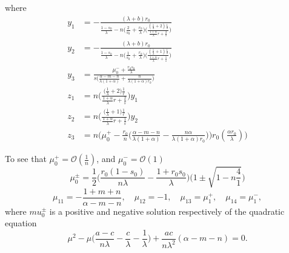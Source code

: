 \documentclass[a4paper,11pt]{article}
\def\BO{{\mathcal{O}}}
\begin{document}
where
\begin{align*}
 y_1&=-\frac{(\lambda+b)r_0}{\frac{1-s_0}{\lambda} - n\Big(\frac{2}{s_0}+\frac{r_0}{\lambda}\Big)\Big(\frac{(\frac{1}{\lambda}+2)\frac{1}{s}}{ \frac{1+\alpha}{\lambda}r + \frac{2}{s} }\Big) }\\
 y_2&=-\frac{(\lambda+b)r_0}{\frac{1-s_0}{\lambda} - n\Big(\frac{1}{s_0}+\frac{r_0}{\lambda}\Big)\Big(\frac{(\frac{1}{\lambda}+1)\frac{1}{s}}{ \frac{1+\alpha}{\lambda}r + \frac{1}{s} }\Big) }\\
 y_3&=\frac{\mu_0^- +\frac{r_0s_0}{\lambda}}{s\Big(\frac{\alpha-m-n}{\lambda(1+\alpha)} + \frac{n}{\lambda(1+\alpha)r_0}\Big)}\\
 z_1&=n\bigg(\frac{\big(\frac{1}{\lambda}+2\big)\frac{1}{r}}{ \frac{1+\alpha}{\lambda}r + \frac{2}{s} }\bigg)y_1 \\
 z_2&=n\bigg(\frac{\big(\frac{1}{\lambda}+1\big)\frac{1}{r}}{ \frac{1+\alpha}{\lambda}r + \frac{1}{s} }\bigg)y_2 \\
 z_3&=n\bigg(\mu_0^+-\frac{r_0}{n}\Big(\frac{\alpha-m-n}{\lambda(1+\alpha)} - \frac{n\alpha}{\lambda(1+\alpha)r_0}\Big)\bigg)r_0(\frac{\alpha r_0}{\lambda})\bigg)
\end{align*}
 



To see that $\mu_0^+ = \BO(\frac{1}{n})$, and $\mu_0^-=\BO(1)$ 
 $$ \mu_0^\pm = \frac{1}{2}\Big(\frac{r_0(1-s_0)}{n\lambda}-\frac{1+r_0s_0}{\lambda}\Big)\Big(1\pm \sqrt{1-n\frac{4}{1}}\Big)$$
\begin{equation}
 \mu_{11}=-\frac{1+m+n}{\alpha-m-n}, \quad \mu_{12}=-1, \quad \mu_{13}=\mu_1^+, \quad \mu_{14}=\mu_1^-,
\end{equation}
 where $mu_0^\pm$ is a positive and negative solution respectively of the quadratic equation
 $$ \mu^2 - \mu\Big(\frac{a-c}{n\lambda}-\frac{c}{\lambda} - \frac{1}{\lambda}\Big) + \frac{ac}{n\lambda^2}(\alpha-m-n)=0.$$ 
\end{document}

